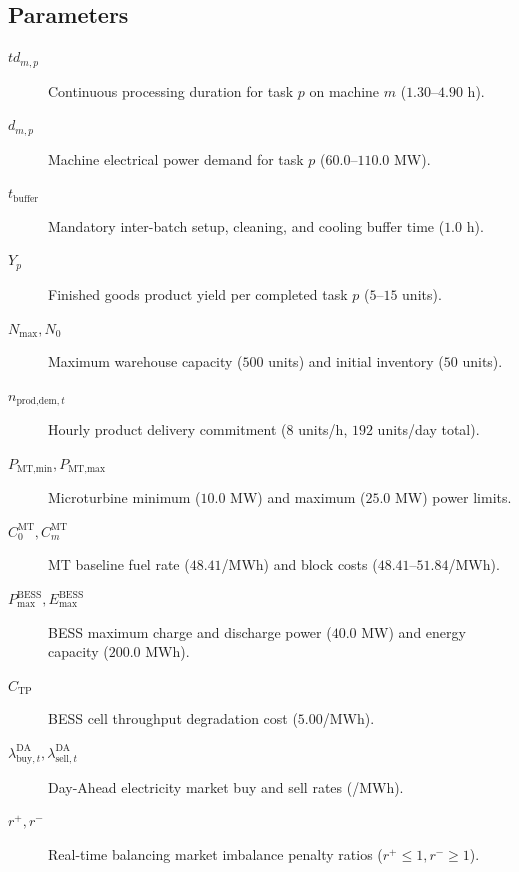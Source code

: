 \documentclass[journal]{IEEEtran}
\begin{document}
\subsection{Parameters}
\begin{description}
\item[$td_{m,p}$] Continuous processing duration for task $p$ on machine $m$ ($1.30$--$4.90$ h).
\item[$d_{m,p}$] Machine electrical power demand for task $p$ ($60.0$--$110.0$ MW).
\item[$t_{\text{buffer}}$] Mandatory inter-batch setup, cleaning, and cooling buffer time ($1.0$ h).
\item[$Y_p$] Finished goods product yield per completed task $p$ ($5$--$15$ units).
\item[$N_{\text{max}}, N_0$] Maximum warehouse capacity ($500$ units) and initial inventory ($50$ units).
\item[$n_{\text{prod,dem},t}$] Hourly product delivery commitment ($8$ units/h, $192$ units/day total).
\item[$P_{\text{MT,min}}, P_{\text{MT,max}}$] Microturbine minimum ($10.0$ MW) and maximum ($25.0$ MW) power limits.
\item[$C_0^{\text{MT}}, C_m^{\text{MT}}$] MT baseline fuel rate (\texteuro $48.41$/MWh) and block costs (\texteuro $48.41$--$51.84$/MWh).
\item[$P_{\text{max}}^{\text{BESS}}, E_{\text{max}}^{\text{BESS}}$] BESS maximum charge and discharge power ($40.0$ MW) and energy capacity ($200.0$ MWh).
\item[$C_{\text{TP}}$] BESS cell throughput degradation cost (\texteuro $5.00$/MWh).
\item[$\lambda_{\text{buy},t}^{\text{DA}}, \lambda_{\text{sell},t}^{\text{DA}}$] Day-Ahead electricity market buy and sell rates (\texteuro /MWh).
\item[$r^+, r^-$] Real-time balancing market imbalance penalty ratios ($r^+ \le 1, r^- \ge 1$).
\end{description}
\end{document}
